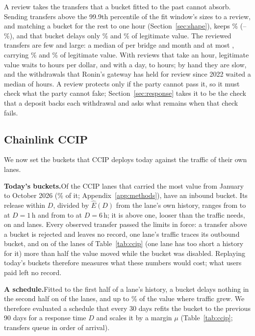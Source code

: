 \documentclass[conference,compsoc]{IEEEtran}
\numberwithin{equation}{section}
\theoremstyle{plain}
\theoremstyle{definition}
\theoremstyle{remark}
\newcommand{\runin}[1]{\par\smallskip\noindent\textbf{#1.}\enspace}
\begin{document}
A review takes the transfers that a bucket fitted to the past cannot absorb. Sending transfers above the 99.9th percentile of the fit window's sizes to a review, and matching a bucket for the rest to one hour (Section~\ref{sec:shape}), keeps \pbReviewPct\% (\pbReviewLoPct--\pbReviewHiPct\%), and that bucket delays only \pbReviewDelayedPct\% and \pbReviewDelayedTwoPct\% of legitimate value. The reviewed transfers are few and large: a median of \pbReviewPerMonthMed{} per bridge and month and at most \pbReviewPerMonthMax{}, carrying \pbReviewSharePct\% and \pbReviewShareTwoPct\% of legitimate value. With reviews that take an hour, legitimate value waits \pbReviewWaitOneH{} to \pbReviewWaitOneHTwo{} hours per dollar, and with a day, \pbReviewWaitDayH{} to \pbReviewWaitDayHTwo{} hours; by hand they are slow, and the \roninReviewN{} withdrawals that Ronin's gateway has held for review since 2022 waited a median of \roninReviewMedH{} hours. A review protects only if the party cannot pass it, so it must check what the party cannot fake; Section~\ref{sec:response} takes it to be the check that a deposit backs each withdrawal and asks what remains when that check fails.

\subsection{Chainlink CCIP}\label{sec:ccip}

We now set the buckets that CCIP deploys today against the traffic of their own lanes.
\runin{Today's buckets}Of the \ccipSelLanes{} CCIP lanes that carried the most value from January to October 2026 (\ccipSelSharePct\% of it; Appendix~\ref{app:methods}), \ccipMisLanes{} have an inbound bucket. Its release within $D$, divided by $\hat{E}(D)$ from the lane's own history, ranges from \ccipInRatioMinOne{} to \ccipInRatioMaxOne{} at $D = 1$\,h and from \ccipInRatioMinSix{} to \ccipInRatioMaxSix{} at $D = 6$\,h; it is above one, looser than the traffic needs, on \ccipInLooseOne{} and \ccipInLooseSix{} lanes. Every observed transfer passed the limits in force: a transfer above a bucket is rejected and leaves no record, one lane's traffic traces its outbound bucket, and on \ccipLanesDisabledHalf{} of the \ccipInLanes{} lanes of Table~\ref{tab:ccip} (one lane has too short a history for it) more than half the value moved while the bucket was disabled. Replaying today's buckets therefore measures what these numbers would cost; what users paid left no record.

\runin{A schedule}Fitted to the first half of a lane's history, a bucket delays nothing in the second half on \ccipOosZero{} of the \ccipOosLanes{} lanes, and up to \ccipOosMaxPct\% of the value where traffic grew. We therefore evaluated a schedule that every 30 days refits the bucket to the previous 90 days for a response time $D$ and scales it by a margin $\mu$ (Table~\ref{tab:ccip}; transfers queue in order of arrival).
\end{document}
